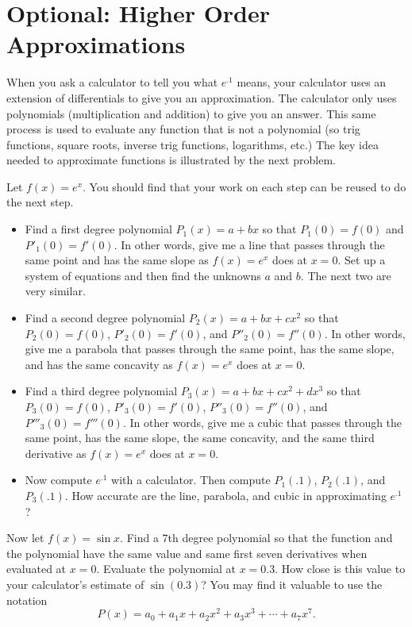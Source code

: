 \newpage
\section{Optional: Higher Order Approximations} 
When you ask a calculator to tell you what $e^{.1}$ means, your calculator uses an extension of differentials to give you an approximation.  The calculator only uses polynomials (multiplication and addition) to give you an answer.  This same process is used to evaluate any function that is not a polynomial (so trig functions, square roots, inverse trig functions, logarithms, etc.) 
The key idea needed to approximate functions is illustrated by the next problem.

\begin{problem} 
Let $f(x)=e^x$. You should find that your work on each step can be reused to do the next step.
\begin{itemize}
\item Find a first degree polynomial $P_1(x)=a+bx$ so that $P_1(0)=f(0)$ and $P'_1(0)=f'(0)$. In other words, give me a line that passes through the same point and has the same slope as $f(x)=e^x$ does at $x=0$. Set up a system of equations and then find the unknowns $a$ and $b$. The next two are very similar.
\item Find a second degree polynomial $P_2(x)=a+bx+cx^2$ so that $P_2(0)=f(0)$, $P'_2(0)=f'(0)$, and $P''_2(0)=f''(0)$. In other words, give me a parabola that passes through the same point, has the same slope, and has the same concavity as $f(x)=e^x$ does at $x=0$. 
\item Find a third degree polynomial $P_3(x)=a+bx+cx^2+dx^3$ so that $P_3(0)=f(0)$, $P'_3(0)=f'(0)$, $P''_3(0)=f''(0)$, and $P'''_3(0)=f'''(0)$. In other words, give me a cubic that passes through the same point, has the same slope, the same concavity, and the same third derivative as $f(x)=e^x$ does at $x=0$. 
\item Now compute $e^{.1}$ with a calculator.  Then compute $P_1(.1)$, $P_2(.1)$, and $P_3(.1)$. How accurate are the line, parabola, and cubic in approximating $e^{.1}$?
\end{itemize}
\end{problem} 



\begin{problem} 
Now let $f(x)=\sin x$. Find a 7th degree polynomial so that the function and the polynomial have the same value and same first seven derivatives when evaluated at $x=0$. Evaluate the polynomial at $x=0.3$. How close is this value to your calculator's estimate of $\sin(0.3)$?  You may find it valuable to use the notation $$P(x) = a_0+a_1x+a_2x^2+a_3x^3 +\cdots+a_7 x^7.$$
\end{problem}




